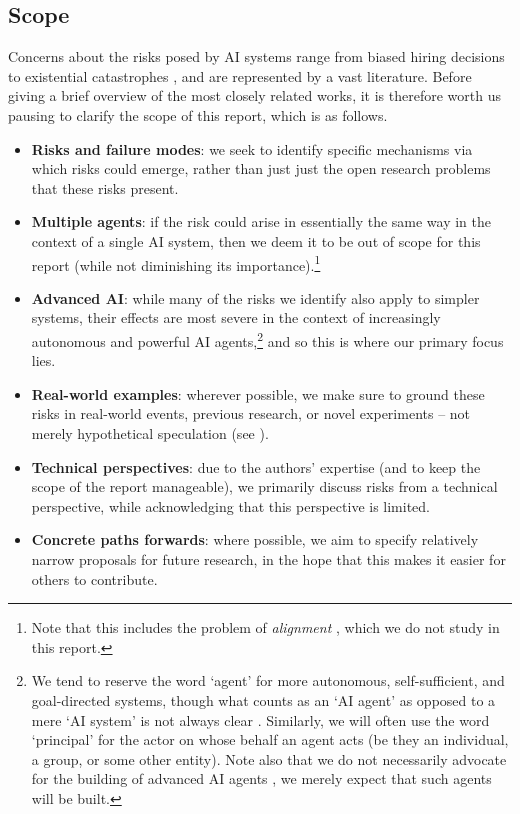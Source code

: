 \subsection{Scope}
\label{sec:scope}


Concerns about the risks posed by AI systems range from biased hiring decisions \citep{Raghavan2020} to existential catastrophes \citep{Bostrom2014}, and are represented by a vast literature.
Before giving a brief overview of the most closely related works, it is therefore worth us pausing to clarify the scope of this report, which is as follows.
\begin{itemize}
    \item \textbf{Risks and failure modes}: we seek to identify specific mechanisms via which risks could emerge, rather than just just the open research problems that these risks present.
    \item \textbf{Multiple agents}: if the risk could arise in essentially the same way in the context of a single AI system, then we deem it to be out of scope for this report (while not diminishing its importance).\footnote{Note that this includes the problem of \textit{alignment} \citep{Russell2019,Ngo2022}, which we do not study in this report.}
    \item \textbf{Advanced AI}: while many of the risks we identify also apply to simpler systems, their effects are most severe in the context of increasingly autonomous and powerful AI agents,\footnote{We tend to reserve the word `agent' for more autonomous, self-sufficient, and goal-directed systems, though what counts as an `AI agent' as opposed to a mere `AI system' is not always clear \citep{Chan2023-aj,Gabriel2024,Kapoor2024}. Similarly, we will often use the word `principal' for the actor on whose behalf an agent acts (be they an individual, a group, or some other entity). Note also that we do not necessarily advocate for the building of advanced AI agents \citep{Mitchell2025}, we merely expect that such agents will be built.} and so this is where our primary focus lies.
    \item \textbf{Real-world examples}: wherever possible, we make sure to ground these risks in real-world events, previous research, or novel experiments -- not merely hypothetical speculation (see ).
    \item \textbf{Technical perspectives}: due to the authors' expertise (and to keep the scope of the report manageable), we primarily discuss risks from a technical perspective, while acknowledging that this perspective is limited.
    \item \textbf{Concrete paths forwards}: where possible, we aim to specify relatively narrow proposals for future research, in the hope that this makes it easier for others to contribute.
\end{itemize}

